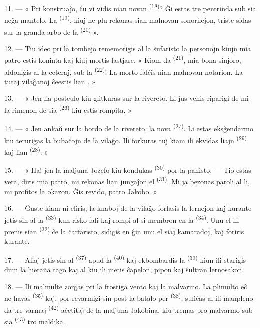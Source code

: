 11. --- « Pri konstruaĵo, ĉu vi vidis nian novan 
\textsuperscript{(18)}? Ĝi estas tre pentrinda sub sia neĝa mantelo. La
 \textsuperscript{(19)}, kiuj ne plu rekonas sian malnovan
sonorilejon, triste sidas sur la granda arbo de la 
\textsuperscript{(20)} ».

12. --- Tiu ideo pri la tombejo rememorigis al la ŝufaristo la personojn kiujn
mia patro estis koninta kaj kiuj mortis lastjare. « Kiom da 
\textsuperscript{(21)}, mia bona sinjoro, aldoniĝis al la ceteraj, sub la
 \textsuperscript{(22)}! La morto falĉis nian malnovan notarion.
La tutaj vilaĝanoj ĉeestis lian . »

13. --- « Jen lia posteulo kiu glitkuras sur la rivereto. Li ĵus venis riparigi
de mi la rimenon de sia  \textsuperscript{(26)} kiu estis
rompita. »

14. --- « Jen ankaŭ sur la bordo de la rivereto, la nova  \textsuperscript{(27)}. Li estas eksĝendarmo kiu terurigas la
bubaĉojn de la vilaĝo. Ili forkuras tuj kiam ili ekvidas liajn 
\textsuperscript{(29)} kaj lian  \textsuperscript{(28)}. »

15. --- « Ha! jen la maljuna Jozefo kiu kondukas  \textsuperscript{(30)} por la panisto. --- Tio estas vera, diris mia
patro, mi rekonas lian jungaĵon el  \textsuperscript{(31)}. Mi ja
bezonas paroli al li, mi profitos la okazon. Ĝis revido, patro Jakobo. »

16. --- Ĝuste kiam ni eliris, la knaboj de la vilaĝo forlasis la lernejon kaj
kurante ĵetis sin al la  \textsuperscript{(33)} kun risko fali
kaj rompi al si membron en la  \textsuperscript{(34)}. Unu el ili
prenis sian  \textsuperscript{(32)} ĉe la ĉarfaristo,
sidigis en ĝin unu el siaj kamaradoj, kaj foriris kurante.

17. --- Aliaj ĵetis sin al  \textsuperscript{(37)} apud la
 \textsuperscript{(40)} kaj ekbombardis la 
\textsuperscript{(39)} kiun ili starigis dum la hieraŭa tago kaj al kiu ili
metis ĉapelon, pipon kaj ŝultran lernosakon.

18. --- Ili malmulte zorgas pri la frostiga vento kaj la malvarmo. La plimulto
eĉ ne havas  \textsuperscript{(35)} kaj, por revarmigi sin
post la batalo per  \textsuperscript{(38)}, sufiĉas al ili
manpleno da tre varmaj  \textsuperscript{(42)} aĉetitaj de la
maljuna  Jakobina, kiu tremas pro malvarmo sub sia
 \textsuperscript{(43)} tro maldika.

